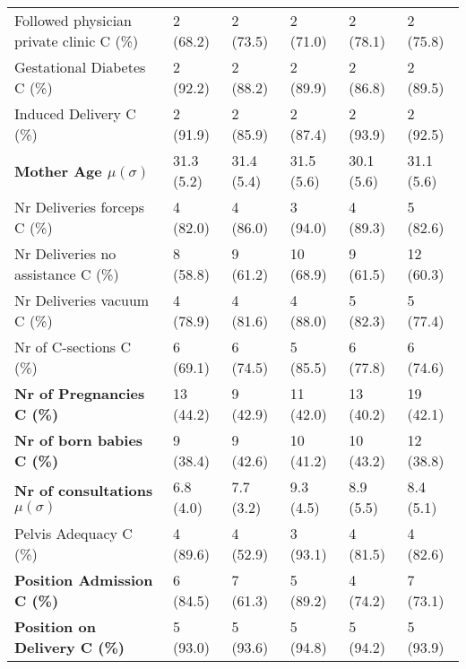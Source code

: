 \begin{tabular}{LLLLLL}
   \begin{minipage}{3.9cm}Followed physician private clinic C (\%)\vspace{1mm}\end{minipage} & 2 (68.2) & 2 (73.5) & 2 (71.0) & 2 (78.1) & 2 (75.8) \\
   Gestational Diabetes C (\%)  & 2 (92.2) & 2 (88.2) & 2 (89.9) & 2 (86.8) & 2 (89.5) \\
   Induced Delivery C (\%) & 2 (91.9) & 2 (85.9) & 2 (87.4) & 2 (93.9) & 2 (92.5) \\
   \textbf{Mother Age $\mu (\sigma)$ }  & 31.3 (5.2) & 31.4 (5.4) & 31.5 (5.6) & 30.1 (5.6) & 31.1 (5.6) \\
   
   \begin{minipage}{3.9cm}Nr Deliveries forceps C (\%)\vspace{1mm}\end{minipage} & 4 (82.0) & 4 (86.0) & 3 (94.0) & 4 (89.3) & 5 (82.6) \\
   \begin{minipage}{3.9cm}Nr Deliveries no assistance C (\%)\vspace{1mm}\end{minipage}  & 8 (58.8) & 9 (61.2) & 10 (68.9) & 9 (61.5) & 12 (60.3) \\
   \begin{minipage}{3.9cm}Nr Deliveries vacuum C (\%)\vspace{1mm}\end{minipage}& 4 (78.9) & 4 (81.6) & 4 (88.0) & 5 (82.3) & 5 (77.4) \\
   Nr of C-sections C (\%) & 6 (69.1) & 6 (74.5) & 5 (85.5) & 6 (77.8) & 6 (74.6) \\
   \textbf{Nr of Pregnancies C (\%)} & 13 (44.2) & 9 (42.9) & 11 (42.0) & 13 (40.2) & 19 (42.1) \\
   \textbf{Nr of born babies C (\%)} & 9 (38.4) & 9 (42.6) & 10 (41.2) & 10 (43.2) & 12 (38.8) \\
   \textbf{Nr of consultations $\mu (\sigma)$ } & 6.8 (4.0) & 7.7 (3.2) & 9.3 (4.5) & 8.9 (5.5) & 8.4 (5.1) \\
   Pelvis Adequacy  C (\%)  & 4 (89.6) & 4 (52.9) & 3 (93.1) & 4 (81.5) & 4 (82.6) \\
   \textbf{Position Admission C (\%)} & 6 (84.5) & 7 (61.3) & 5 (89.2) & 4 (74.2) & 7 (73.1) \\
   \textbf{Position on Delivery C (\%)} & 5 (93.0) & 5 (93.6) & 5 (94.8) & 5 (94.2) & 5 (93.9) \\
   

\end{tabular}
